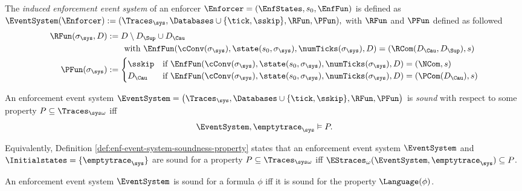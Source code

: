 \begin{definition}
    \label{def:induced-event-system}
    The \emph{induced enforcement event system} of an enforcer
    $\Enforcer = (\EnfStates, s_0, \EnfFun)$ is defined as
    $ \EventSystem(\Enforcer) :=
    (\Traces_\sys, \Databases \cup \{\tick, \sskip \}, \RFun, \PFun), $
    with  $\RFun$ and $\PFun$ defined as followed
    \begin{align*}
        \RFun(\sigma_\sys, D)
        &:= D \setminus D_\Sup \cup D_\Cau \\
        &\qquad \text{with }
        \EnfFun(\cConv(\sigma_\sys), \state(s_0, \sigma_\sys), \numTicks(\sigma_\sys), D) =
        (\RCom(D_\Cau, D_\Sup), s) %
        \\
        \PFun(\sigma_\sys) &:=
        \begin{cases}
            \sskip &\text{if }
                \EnfFun(\cConv(\sigma_\sys), \state(s_0, \sigma_\sys), \numTicks(\sigma_\sys), D) =
                (\NCom, s) \\
            D_\Cau &\text{if }
                \EnfFun(\cConv(\sigma_\sys), \state(s_0, \sigma_\sys), \numTicks(\sigma_\sys), D) =
                (\PCom(D_\Cau), s)
        \end{cases}
    \end{align*}
\end{definition}

\begin{definition}
    \label{def:enf-event-system-soundness-property}
    An enforcement event system
    $\EventSystem =
    \left(\Traces_\sys, \Databases \cup \{ \tick, \sskip \}, \RFun, \PFun \right)$
    is \emph{sound} with respect to some
    property $P \subseteq \Traces_{\sys \omega}$ iff
    \begin{equation*}
        \EventSystem, \emptytrace_\sys \vDash P.
    \end{equation*}    
\end{definition}
Equivalently, Definition \ref{def:enf-event-system-soundness-property}
states that an enforcement event system $\EventSystem$ and
$\Initialstates = \{ \emptytrace_\sys \}$
are sound for a property $P \subseteq \Traces_{\sys \omega}$
iff $\EStraces_\omega(\EventSystem, \emptytrace_\sys) \subseteq P$.

\begin{definition}
    \label{def:enf-event-system-soundness-formula}
    An enforcement event system $\EventSystem$ is sound for a formula $\phi$
    iff it is sound for the property $\Language(\phi)$.
\end{definition}

